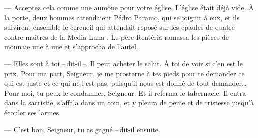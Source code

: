   --- Acceptez cela comme une aumône pour votre église.
\pend
%
\pstart
  L'église était déjà vide. À la porte, deux hommes attendaient Pédro Paramo, qui se joignit à eux, et ils suivirent ensemble le cercueil qui attendait reposé sur les épaules de quatre contre-maîtres de la Media Luna\footnotemark[1]
.
\pend
%
\pstart
  Le père Rentéria ramassa les pièces de monnaie une à une et s'approcha de l'autel.

  --- Elles sont à toi --\,dit-il\,--. Il peut acheter le salut. À toi de voir si c'en est le prix. Pour ma part, Seigneur, je me prosterne à tes pieds pour te demander ce qui est juste et ce qui ne l'est pas, puisqu'il nous est donné de tout demander\ldots Pour moi, tu peux le condamner, Seigneur.
\pend
%
\pstart
  Et il referma le tabernacle.
\pend
%
\pstart
  Il entra dans la sacristie, s'affala dans un coin, et y pleura de peine et de tristesse jusqu'à écouler ses larmes.

  --- C'est bon, Seigneur, tu as gagné --\,dit-il ensuite.
\pend
